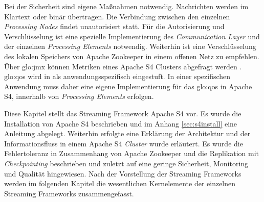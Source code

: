 Bei der Sicherheit sind eigene Maßnahmen notwendig. Nachrichten werden im Klartext oder binär übertragen. Die Verbindung zwischen den einzelnen \textit{Processing Nodes} findet unautorisiert statt. Für die Autorisierung und Verschlüsselung ist eine spezielle Implementierung des \textit{Communication Layer} und der einzelnen \textit{Processing Elements} notwendig. Weiterhin ist eine Verschlüsselung des lokalen Speichers von Apache Zookeeper in einem offenen Netz zu empfehlen. Über \gls{glo:jmx} können Metriken eines Apache S4 Clusters abgefragt werden . \gls{glo:qos} wird in  als anwendungsspezifisch eingestuft. In einer spezifischen Anwendung muss daher eine eigene Implementierung für das \gls{glo:qos} in Apache S4, innerhalb von \textit{Processing Elements} erfolgen.


Diese Kapitel stellt das Streaming Framework Apache S4 vor. Es wurde die Installation von Apache S4 beschrieben und im Anhang \ref{sec:s4install} eine Anleitung abgelegt. Weiterhin erfolgte eine Erklärung der Architektur und der Informationsfluss in einem Apache S4 \textit{Cluster} wurde erläutert. Es wurde die Fehlertoleranz in Zusammenhang von Apache Zookeeper und die Replikation mit \textit{Checkpointing} beschrieben und zuletzt auf eine geringe Sicherheit, Monitoring und Qualität hingewiesen. Nach der Vorstellung der Streaming Frameworks werden im folgenden Kapitel die wesentlichen Kernelemente der einzelnen Streaming Frameworks zusammengefasst.